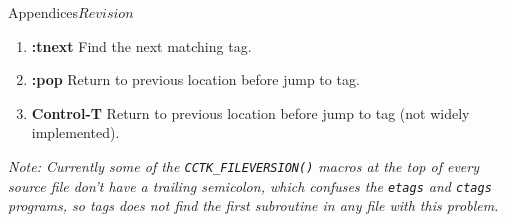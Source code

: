 \begin{cactuspart}{Appendices}{}{$Revision$}
\begin{enumerate}
\item \textbf{:tnext}
Find the next matching tag.

\item \textbf{:pop}
Return to previous location before jump to tag.

\item \textbf{Control-T}
Return to previous location before jump to tag (not widely implemented).

\end{enumerate}

\vspace{1.1cm}

\emph{Note: Currently some of the \texttt{CCTK\_FILEVERSION()} macros
at the top of every source file don't have a trailing semicolon, which
confuses the \texttt{etags} and \texttt{ctags} programs, so tags does not
find the first subroutine in any file with this problem.}



\end{cactuspart}

